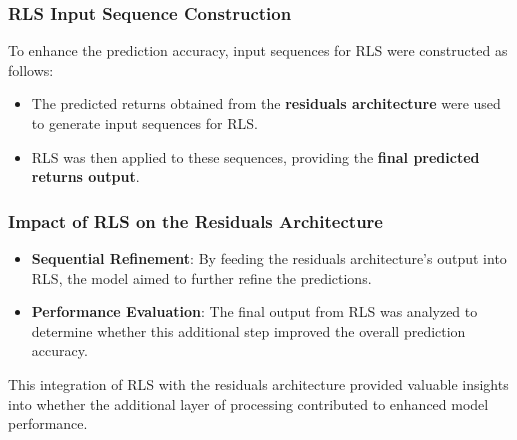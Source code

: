 \subsubsection{RLS Input Sequence Construction}

To enhance the prediction accuracy, input sequences for RLS were constructed as follows:
\begin{itemize}
    \item The predicted returns obtained from the \textbf{residuals architecture} were used to generate input sequences for RLS.
    \item RLS was then applied to these sequences, providing the \textbf{final predicted returns output}.
\end{itemize}

\subsubsection{Impact of RLS on the Residuals Architecture}

\begin{itemize}
    \item \textbf{Sequential Refinement}: By feeding the residuals architecture's output into RLS, the model aimed to further refine the predictions.
    \item \textbf{Performance Evaluation}: The final output from RLS was analyzed to determine whether this additional step improved the overall prediction accuracy.
\end{itemize}

This integration of RLS with the residuals architecture provided valuable insights into whether the additional layer of processing contributed to enhanced model performance.




